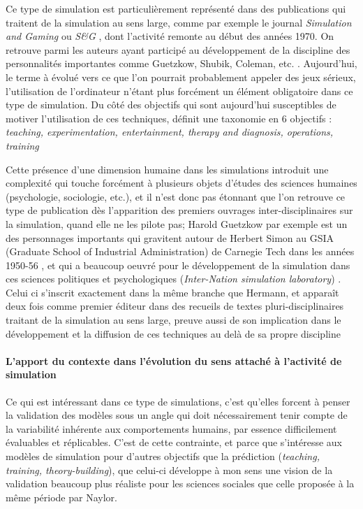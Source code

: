 Ce type de simulation est particulièrement représenté dans des publications qui traitent de la simulation au sens large, comme par exemple le journal \textit{Simulation and Gaming} ou \textit{S\&G} \autocite{Crookall2011}, dont l'activité remonte au début des années 1970. On retrouve parmi les auteurs ayant participé au développement de la discipline des personnalités importantes comme Guetzkow, Shubik, Coleman, etc. \autocite{Crookall2012}. Aujourd'hui, le terme à évolué vers ce que l'on pourrait probablement appeler des jeux sérieux, l'utilisation de l'ordinateur n'étant plus forcément un élément obligatoire dans ce type de simulation. Du côté des objectifs qui sont aujourd'hui susceptibles de motiver l'utilisation de ces techniques, \textcite{Shubik2009} définit une taxonomie en 6 objectifs : \textit{teaching, experimentation, entertainment, therapy and diagnosis, operations, training }

Cette présence d'une dimension humaine dans les simulations introduit une complexité qui touche forcément à plusieurs objets d'études des sciences humaines (psychologie, sociologie, etc.), et il n'est donc pas étonnant que l'on retrouve ce type de publication dès l'apparition des premiers ouvrages inter-disciplinaires sur la simulation, quand elle ne les pilote pas; Harold Guetzkow par exemple est un des personnages importants qui gravitent autour de Herbert Simon au GSIA (Graduate School of Industrial Administration) de Carnegie Tech dans les années 1950-56 \autocite{Guetzkow2004}, et qui a beaucoup oeuvré pour le développement de la simulation dans ces sciences politiques et psychologiques (\textit{Inter-Nation simulation laboratory}) \autocite{Janda2011, Druckman2010}. Celui ci s'inscrit exactement dans la même branche que Hermann, et apparaît deux fois comme premier éditeur dans des recueils de textes pluri-disciplinaires traitant de la simulation au sens large, preuve aussi de son implication dans le développement et la diffusion de ces techniques au delà de sa propre discipline \autocite{Guetzkow1962, Guetzkow1972}

\paragraph{L'apport du contexte dans l'évolution du sens attaché à l'activité de simulation}

Ce qui est intéressant dans ce type de simulations, c'est qu'elles forcent à penser la validation des modèles sous un angle qui doit nécessairement tenir compte de la variabilité inhérente aux comportements humains, par essence difficilement évaluables et réplicables. C'est de cette contrainte, et parce que \textcite{Hermann1967} s'intéresse aux modèles de simulation pour d'autres objectifs que la prédiction (\textit{teaching, training, theory-building}), que celui-ci développe à mon sens une vision de la validation beaucoup plus réaliste pour les sciences sociales que celle proposée à la même période par Naylor.

